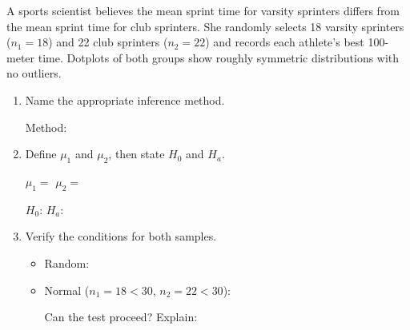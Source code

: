 \documentclass[10pt]{article}
\begin{document}
\namedateperiod

\vspace{0.15in}

A sports scientist believes the mean sprint time for varsity sprinters differs from the
mean sprint time for club sprinters. She randomly selects 18 varsity sprinters
($n_1 = 18$) and 22 club sprinters ($n_2 = 22$) and records each athlete's best
100-meter time. Dotplots of both groups show roughly symmetric distributions with
no outliers.

\begin{enumerate}
  \item Name the appropriate inference method.

        Method: \blank{6cm}

  \item Define $\mu_1$ and $\mu_2$, then state $H_0$ and $H_a$.

        $\mu_1 = $ \blank{5.5cm} \qquad $\mu_2 = $ \blank{5.5cm}

        $H_0$: \blank{4.5cm} \qquad $H_a$: \blank{4.5cm}

  \item Verify the conditions for both samples.
        \begin{itemize}
          \item Random: \writeline
          \item Normal ($n_1 = 18 < 30$, $n_2 = 22 < 30$): \writeline

                Can the test proceed? \blank{1.5cm} \quad Explain: \writeline
        \end{itemize}
\end{enumerate}
\end{document}
